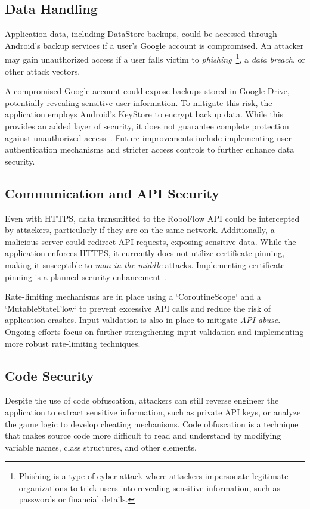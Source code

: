 \subsection{Data Handling}
Application data, including DataStore backups, could be accessed through Android's backup services if a user's Google account is compromised. An attacker may gain unauthorized access if a user falls victim to \textit{phishing}~\footnote{Phishing is a type of cyber attack where attackers impersonate legitimate organizations to trick users into revealing sensitive information, such as passwords or financial details.}, a \textit{data breach}, or other attack vectors.


A compromised Google account could expose backups stored in Google Drive, potentially revealing sensitive user information. To mitigate this risk, the application employs Android's KeyStore to encrypt backup data. While this provides an added layer of security, it does not guarantee complete protection against unauthorized access~\cite{bib:android_data_backup}. Future improvements include implementing user authentication mechanisms and stricter access controls to further enhance data security.

\subsection{Communication and API Security}
Even with HTTPS, data transmitted to the RoboFlow API could be intercepted by attackers, particularly if they are on the same network. Additionally, a malicious server could redirect API requests, exposing sensitive data. While the application enforces HTTPS, it currently does not utilize certificate pinning, making it susceptible to \textit{man-in-the-middle} attacks. Implementing certificate pinning is a planned security enhancement~\cite{bib:owasp_top_ten}.  

Rate-limiting mechanisms are in place using a `CoroutineScope` and a `MutableStateFlow` to prevent excessive API calls and reduce the risk of application crashes. Input validation is also in place to mitigate \textit{API abuse}. Ongoing efforts focus on further strengthening input validation and implementing more robust rate-limiting techniques.

\subsection{Code Security}
Despite the use of code obfuscation, attackers can still reverse engineer the application to extract sensitive information, such as private API keys, or analyze the game logic to develop cheating mechanisms. Code obfuscation is a technique that makes source code more difficult to read and understand by modifying variable names, class structures, and other elements.

